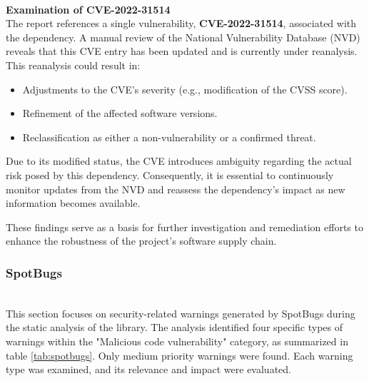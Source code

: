 \documentclass[sigconf]{acmart}
\begin{document}
\hfill\\
{\textbf{Examination of CVE-2022-31514}}
\hfill\\

The report references a single vulnerability, \textbf{CVE-2022-31514}, associated with the dependency. A manual review of the National Vulnerability Database (NVD) \cite{NVD} reveals that this CVE entry has been updated and is currently under reanalysis. This reanalysis could result in:
\begin{itemize}
    \item Adjustments to the CVE’s severity (e.g., modification of the CVSS score).
    \item Refinement of the affected software versions.
    \item Reclassification as either a non-vulnerability or a confirmed threat.
\end{itemize}

Due to its modified status, the CVE introduces ambiguity regarding the actual risk posed by this dependency. Consequently, it is essential to continuously monitor updates from the NVD and reassess the dependency’s impact as new information becomes available.

These findings serve as a basis for further investigation and remediation efforts to enhance the robustness of the project's software supply chain.




\subsubsection{SpotBugs}
\hfill\\
This section focuses on security-related warnings generated by SpotBugs during the static analysis of the library. The analysis identified four specific types of warnings within the "Malicious code vulnerability" category, as summarized in table \ref{tab:spotbugs}. Only medium priority warnings were found. Each warning type was examined, and its relevance and impact were evaluated. 
\end{document}
